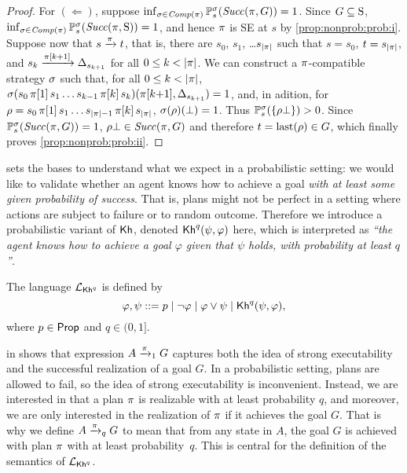 \begin{proof}
  For $(\Leftarrow)$, suppose
  $\inf_{\strat\in\Comp(\plan)}\Prob^\strat_s(\Succ(\plan,G))=1$.
  Since $G\subseteq\S$,
  $\inf_{\strat\in\Comp(\plan)}\Prob^\strat_s(\Succ(\plan,\S))=1$, and
  hence $\plan$ is SE at $s$ by \cref{prop:nonprob:prob:i}.
  Suppose now that $s \reach{\plan} t$, that is, there are $s_0$,
  $s_1$, \ldots $s_{\size{\plan}}$ such that $s=s_0$, $t=s_{\size{\plan}}$, and
  $s_k\reach{\plan[k{+}1]}\Dirac_{s_{k{+}1}}$ for all $0\leq k < \size{\plan}$.
  We can construct a $\plan$-compatible strategy $\strat$
  such that, for all $0\leq k < \size{\plan}$,
  $\strat(s_0\,\plan[1]\,s_1\ldots s_{k{-}1}\,\plan[k]\,s_k)(\plan[k{+}1],\Dirac_{s_{k{+}1}})=1$,
  and, in adition, for
  $\rho = s_0\,\plan[1]\,s_1\ldots s_{\size{\plan}{-}1}\,\plan[k]\,s_{\size{\plan}}$,
  $\strat(\rho)(\complete)=1$.
  Thus $\Prob^\strat_s(\{\rho\bot\})>0$.  Since
  $\Prob^\strat_s(\Succ(\plan,G))=1$, $\rho\bot\in\Succ(\plan,G)$
  and therefore $t=\last(\rho)\in G$, which finally proves
  \cref{prop:nonprob:prob:ii}.
\end{proof}


 sets the bases to understand what we expect in
a probabilistic setting: we would like to validate whether an agent
knows how to achieve a goal \emph{with at least some given probability
of success}.  That is, plans might not be perfect in a setting where
actions are subject to failure or to random outcome.
%
Therefore we introduce a probabilistic variant of $\kh$,
denoted $\kh^q(\psi,\varphi)$ here, which is interpreted as \emph{``the agent knows
how to achieve a goal $\varphi$ given that $\psi$ holds, with
probability at least $q$''}.


\begin{definition}\label{def:syntax:PKh}
  The language $\PKh$ is defined by
  \[
  \varphi, \psi ::=
  p \mid \neg \varphi \mid \varphi \vee \psi \mid \kh^q(\psi,\varphi),
  \]
  where $p\in\Prop$ and $q\in(0,1]$.
\end{definition}


 in  shows that
expression $A\reach{\plan}_1 G$ captures both the idea of strong
executability and the successful realization of a goal $G$.  In a
probabilistic setting, plans are allowed to fail, so the idea of
strong executability is inconvenient.  Instead, we are interested in that
a plan $\plan$ is realizable with at least probability $q$, and
moreover, we are only interested in the realization of $\plan$ if it
achieves the goal $G$.  That is why we define $A\reach{\plan}_q G$ to
mean that from any state in $A$, the goal $G$ is achieved with plan
$\plan$ with at least probability~$q$.  This is central for the
definition of the semantics of $\PKh$.

